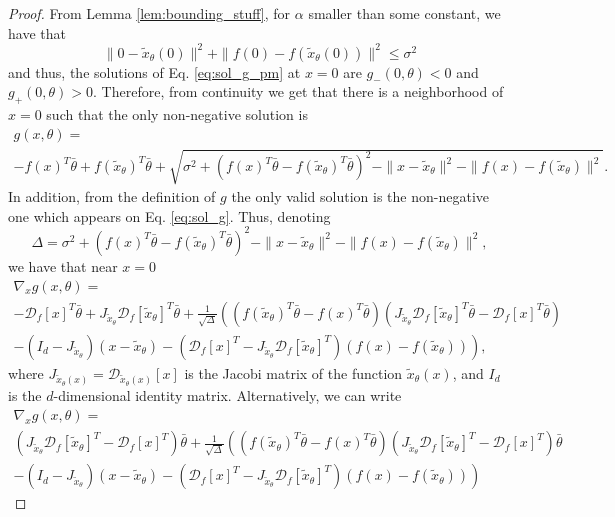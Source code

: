 \documentclass[12pt]{article}
\theoremstyle{remark}
\newcommand{\DD}{\mathcal{D}}
\newcommand{\wtilde}[1]{\widetilde{#1}}
\begin{document}
\begin{appendices}
\begin{proof}
From Lemma \ref{lem:bounding_stuff}, for $\alpha$ smaller than some constant, we have that
\[ 
\|0- \wtilde{x}_\theta(0)\|^2 + \|f(0)- f(\wtilde{x}_\theta(0)) \|^2 \leq \sigma^2
\]
and thus, the solutions of Eq. \eqref{eq:sol_g_pm} at $x=0$ are $g_{-}(0, \theta) < 0$ and $g_{+}(0, \theta) > 0$.
Therefore, from continuity we get that there is a neighborhood of $x=0$ such that the only non-negative solution is
\begin{multline}\label{eq:sol_g}
    g(x,\theta) =\\ -f(x)^T \bar \theta + f(\wtilde{x}_\theta)^T \bar \theta + 
    \sqrt{\sigma^2 + (f(x)^T \bar \theta - f(\wtilde{x}_\theta)^T \bar \theta)^2 - \|x- \wtilde{x}_\theta\|^2 - \|f(x)- f(\wtilde{x}_\theta) \|^2}
.\end{multline}
In addition, from the definition of $g$ the only valid solution is the non-negative one which appears on Eq. \eqref{eq:sol_g}.
Thus, denoting 
\begin{equation}\label{eq:Delta}
\Delta = \sigma^2 + (f(x)^T \bar \theta - f(\wtilde{x}_\theta)^T \bar \theta)^2 - \|x- \wtilde{x}_\theta\|^2 - \|f(x)- f(\wtilde{x}_\theta) \|^2,
\end{equation}
we have that near $x=0$
\begin{multline}\label{eq:nabla_g}
    \nabla_x{g}(x,\theta) =\\ -\DD_f[x]^T\bar\theta + J_{\wtilde{x}_\theta} \DD_f[\wtilde{x}_\theta]^T \bar \theta 
    +
    \frac{1}{\sqrt{\Delta}}
    \left( 
     (f(\wtilde{x}_\theta)^T \bar \theta - f(x)^T \bar \theta)\left(J_{\wtilde{x}_\theta}\DD_f[\wtilde{x}_\theta]^T \bar \theta - \DD_f[x]^T \bar \theta\right) 
    \right. \\
    \left.- 
    (I_d-J_{\wtilde{x}_\theta})(x- \wtilde{x}_\theta) 
    - 
    (\DD_f[x]^T - J_{\wtilde{x}_\theta}\DD_f[\wtilde{x}_\theta]^T)(f(x)- f(\wtilde{x}_\theta))  \right)
,\end{multline}
where $J_{\wtilde x_\theta(x)} = \DD_{\wtilde x_\theta (x)}[x]$ is the Jacobi matrix of the function $\wtilde x_\theta (x)$, and $I_d$ is the $d$-dimensional identity matrix.
Alternatively, we can write
\begin{multline}\label{eq:nabla_g2}
    \nabla_x{g}(x,\theta) =\\ (J_{\wtilde{x}_\theta} \DD_f[\wtilde{x}_\theta]^T - \DD_f[x]^T ) \bar\theta 
    +
    \frac{1}{\sqrt{\Delta}}
    \left( 
     (f(\wtilde{x}_\theta)^T\bar\theta - f(x)^T\bar\theta ) \left(J_{\wtilde{x}_\theta}\DD_f[\wtilde{x}_\theta]^T - \DD_f[x]^T \right)\bar\theta 
    \right. \\
    \left.- 
    (I_d-J_{\wtilde{x}_\theta})(x- \wtilde{x}_\theta) 
    - 
    (\DD_f[x]^T - J_{\wtilde{x}_\theta}\DD_f[\wtilde{x}_\theta]^T)(f(x)- f(\wtilde{x}_\theta))  \right)
\end{multline}



\end{proof}
\end{appendices}
\end{document}
